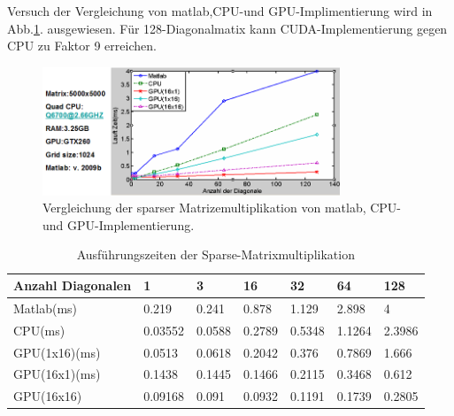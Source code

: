 

Versuch der Vergleichung von matlab,CPU-und GPU-Implimentierung wird in Abb.\ref{sparse_ergebnis}. ausgewiesen. Für 128-Diagonalmatix kann CUDA-Implementierung gegen CPU zu Faktor 9 erreichen.


\begin{figure}[htbp]
\includegraphics[width=3.5in]{../xby/pic//sparse_ergebnis}
\caption{Vergleichung der sparser Matrizemultiplikation von matlab, CPU-und GPU-Implementierung.}
\label{sparse_ergebnis}
\end{figure}


\begin{table}
\caption{Ausführungszeiten der Sparse-Matrixmultiplikation} 
\label{sparse_result}
\centering
\begin{tabular}{|p{46pt}p{20pt}p{20pt}p{20pt}p{20pt}p{20pt}p{20pt}|}
\toprule
Anzahl Diagonalen& 1& 3& 16& 32& 64 &128\\

\midrule
Matlab(ms)&			0.219&   0.241&   0.878&   1.129&   2.898& 4\\
CPU(ms)& 			0.03552&   0.0588& 	0.2789& 0.5348&  1.1264& 2.3986\\
GPU(1x16)(ms)& 0.0513&   0.0618&  0.2042&  0.376&  0.7869& 1.666\\
GPU(16x1)(ms)& 0.1438&	 0.1445&	0.1466&	0.2115&	 0.3468&	0.612\\

GPU(16x16) & 0.09168&	0.091&	0.0932&	0.1191&	0.1739&	0.2805\\
\bottomrule
\end{tabular}
\end{table}